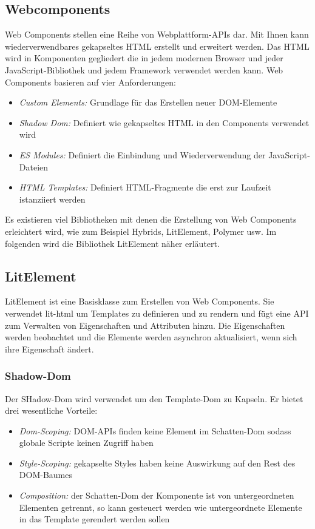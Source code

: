\documentclass[12pt,					%
							 oneside,			%
							 a4paper,			%
							 halfparskip,		%
							 liststotoc,			%
							 bibtotoc,			%
							 fleqn,				%
							 pointlessnumbers]	%
							 {scrreprt}
\begin{document}
				\subsection{Webcomponents}
				Web Components stellen eine Reihe von Webplattform-APIs dar. Mit Ihnen kann wiederverwendbares gekapseltes HTML erstellt und erweitert werden. Das HTML wird in Komponenten gegliedert die in jedem modernen Browser und jeder JavaScript-Bibliothek und jedem Framework verwendet werden kann. Web Components basieren auf vier Anforderungen: 
\begin{itemize}
\item \textit{Custom Elements:} Grundlage für das Erstellen neuer DOM-Elemente
\item \textit{Shadow Dom:} Definiert wie gekapseltes HTML in den Components verwendet wird
\item \textit{ES Modules:} Definiert die Einbindung und Wiederverwendung der JavaScript-Dateien
\item \textit{HTML Templates:} Definiert HTML-Fragmente die erst zur Laufzeit istanziiert werden
\end{itemize} Es existieren viel Bibliotheken mit denen die Erstellung von Web Components erleichtert wird, wie zum Beispiel Hybrids, LitElement, Polymer usw. Im folgenden wird die Bibliothek LitElement näher erläutert.\cite{webcom}
				\subsection{LitElement}
				LitElement ist eine Basisklasse zum Erstellen von Web Components. Sie verwendet lit-html um Templates zu definieren und zu rendern und fügt eine API zum Verwalten von Eigenschaften und Attributen hinzu.  Die Eigenschaften werden beobachtet und die Elemente werden asynchron aktualisiert, wenn sich ihre Eigenschaft ändert. 
					\subsubsection{Shadow-Dom}
					Der SHadow-Dom wird verwendet um den Template-Dom zu Kapseln. Er bietet drei wesentliche Vorteile: 
					\begin{itemize}
\item \textit{Dom-Scoping:} DOM-APIs finden keine Element im Schatten-Dom sodass globale Scripte keinen Zugriff haben
\item \textit{Style-Scoping:} gekapselte Styles haben keine Auswirkung auf den Rest des DOM-Baumes
\item \textit{Composition:} der Schatten-Dom der Komponente ist von untergeordneten Elementen getrennt, so kann gesteuert werden wie untergeordnete Elemente in das Template gerendert werden sollen\cite{webcom}
\end{itemize}
					
\end{document}
